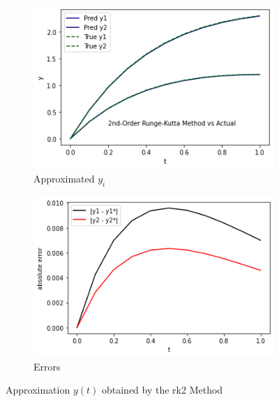 \documentclass[12pt,oneside]{book}
\begin{document}
		\begin{figure}[h!]
			\centering
			\begin{subfigure}[h]{0.47\textwidth}
				\centering
				\includegraphics[width=\textwidth]{rk2}
				\caption{Approximated $ y_{i} $}
			\end{subfigure}
			\hfill
			\begin{subfigure}[h]{0.47\textwidth}
				\centering
				\includegraphics[width=\textwidth]{rk2_err}
				\caption{Errors}
			\end{subfigure}
			\caption{Approximation $ y(t) $ obtained by the \ac{rk2} Method}
			\label{fig:rk2}
		\end{figure}
	
\end{document}

